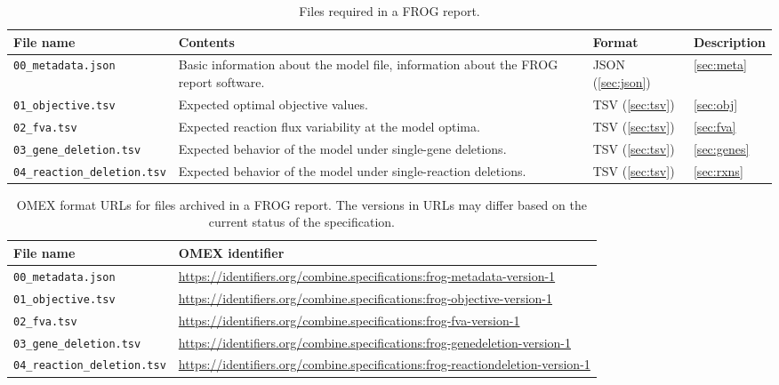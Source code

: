 \begin{table}\tablefont
\begin{tabular}{lp{.3\linewidth}ll}
\toprule
File name & Contents & Format & Description \\
\midrule
\texttt{00\_metadata.json}
 & Basic information about the model file, information about the FROG report software.
 & JSON (\cref{sec:json})
 & \cref{sec:meta}
 \\\addlinespace
\texttt{01\_objective.tsv}
 & Expected optimal objective values.
 & TSV (\cref{sec:tsv})
 & \cref{sec:obj}
 \\\addlinespace
\texttt{02\_fva.tsv}
 & Expected reaction flux variability at the model optima.
 & TSV (\cref{sec:tsv})
 & \cref{sec:fva}
 \\\addlinespace
\texttt{03\_gene\_deletion.tsv}
 & Expected behavior of the model under single-gene deletions.
 & TSV (\cref{sec:tsv})
 & \cref{sec:genes}
 \\\addlinespace
\texttt{04\_reaction\_deletion.tsv}
 & Expected behavior of the model under single-reaction deletions.
 & TSV (\cref{sec:tsv})
 & \cref{sec:rxns} \\
\bottomrule
\end{tabular}
\caption{Files required in a FROG report.}
\label{tab:files}
\end{table}

\begin{table}\tablefont
\begin{tabular}{lp{.6\linewidth}}
\toprule
File name & OMEX identifier \\
\midrule
\texttt{00\_metadata.json}
 & \url{https://identifiers.org/combine.specifications:frog-metadata-version-1}
 \\
\texttt{01\_objective.tsv}
 & \url{https://identifiers.org/combine.specifications:frog-objective-version-1}
 \\
\texttt{02\_fva.tsv}
 & \url{https://identifiers.org/combine.specifications:frog-fva-version-1}
 \\
\texttt{03\_gene\_deletion.tsv}
 & \url{https://identifiers.org/combine.specifications:frog-genedeletion-version-1}
 \\
\texttt{04\_reaction\_deletion.tsv}
 & \url{https://identifiers.org/combine.specifications:frog-reactiondeletion-version-1}
 \\
\bottomrule
\end{tabular}
\caption{OMEX format URLs for files archived in a FROG report. The versions in URLs may differ based on the current status of the specification.}
\label{tab:omex}
\end{table}

